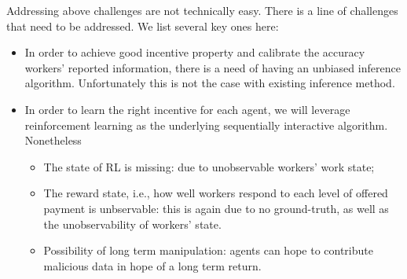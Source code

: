 Addressing above challenges are not technically easy. There is a line of challenges that need to be addressed. We list several key ones here:
\begin{itemize}
\item In order to achieve good incentive property and calibrate the accuracy workers' reported information, there is a need of having an unbiased inference algorithm. Unfortunately this is not the case with existing inference method. %
\item In order to learn the right incentive for each agent, we will leverage reinforcement learning as the underlying sequentially interactive algorithm. Nonetheless
\begin{itemize}
\item The state of RL is missing: due to unobservable workers' work state;
\item The reward state, i.e., how well workers respond to each level of offered payment is unbservable: this is again due to no ground-truth, as well as the unobservability of workers' state.
\item Possibility of long term manipulation: agents can hope to contribute malicious data in hope of a long term return. 
\end{itemize}
\end{itemize}


